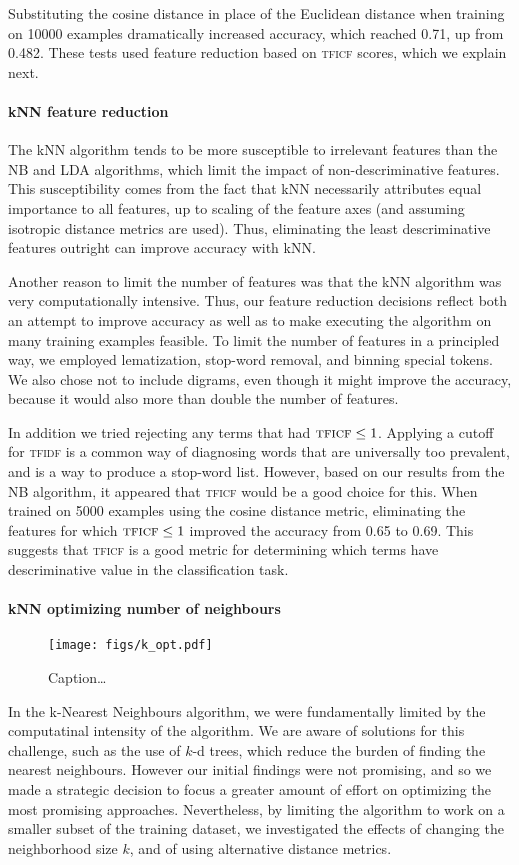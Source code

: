 \documentclass[conference,letterpaper]{IEEEtran}
\begin{document}
Substituting the cosine distance in place of the Euclidean distance when 
training on 10000 examples dramatically increased accuracy, which reached 0.71,
up from 0.482.  These tests used feature reduction based on \textsc{tficf} 
scores, which we explain next.

\paragraph*{kNN feature reduction}
The kNN algorithm tends to be more susceptible to irrelevant
features than the NB and LDA algorithms, which limit the impact of 
non-descriminative features.
This susceptibility comes from the fact that kNN necessarily attributes equal 
importance to all features, up to scaling of the feature axes 
(and assuming isotropic distance metrics are used).  Thus, eliminating the
least descriminative features outright can improve accuracy with kNN.

Another reason to limit the number of features was that the kNN algorithm was
very computationally intensive.  Thus, our feature reduction decisions reflect
both an attempt to improve accuracy as well as to make executing the algorithm
on many training examples feasible.
To limit the number of features in a principled way, we employed lematization, 
stop-word removal, and binning special tokens.  We also chose not to include
digrams, even though it might improve the accuracy, because it would also more 
than double the number of features.

In addition we tried rejecting any terms that had $\textsc{tficf} \leq 1$.  
Applying a cutoff for \textsc{tfidf} is a common
way of diagnosing words that are universally too prevalent, and is a way to
produce a stop-word list.  However, based on our results from the NB algorithm,
it appeared that \textsc{tficf} would be a good choice for this.  When
trained on 5000 examples using the cosine distance metric, eliminating 
the features for which $\textsc{tficf}\leq 1$ improved the accuracy from 0.65
to 0.69.  This suggests that \textsc{tficf} is a good metric for determining
which terms have descriminative value in the classification task.

\paragraph*{kNN optimizing number of neighbours}
\begin{figure}
	\centering
	\texttt{[image: figs/k\_opt.pdf]}
	\caption{Caption\dots}
	\label{fig:k_opt}
\end{figure}
In the k-Nearest Neighbours algorithm, we were fundamentally limited by 
the computatinal intensity of the algorithm.  We are aware of solutions for
this challenge, such as the use of $k$-d trees, which reduce the burden of
finding the nearest neighbours.  However our initial findings were not 
promising, and so we made a strategic decision to focus a greater amount of
effort on optimizing the most promising approaches.  Nevertheless, by limiting
the algorithm to work on a smaller subset of the training dataset, we 
investigated the effects of changing the neighborhood size $k$, and of using
alternative distance metrics.
\end{document}
